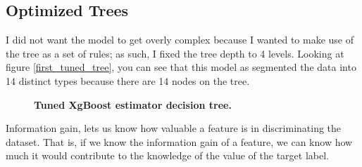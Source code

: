 \subsection*{Optimized Trees}
I did not want the model to get overly complex because I wanted to make use of the tree as a set of rules; as such, I fixed the tree depth to 4 levels. Looking at figure \ref{first_tuned_tree}, you can see that this model as segmented the data into 14 distinct types because there are 14 nodes on the tree.
\begin{figure}[!hbtp]
\centering

    \qquad


    \caption{\textbf{Tuned XgBoost estimator decision tree.}}
\end{figure}


Information gain, lets us know how valuable a feature is in discriminating the dataset. That is, if we know the information gain of a feature, we can know how much it would contribute to the knowledge of the value of the target label. 

